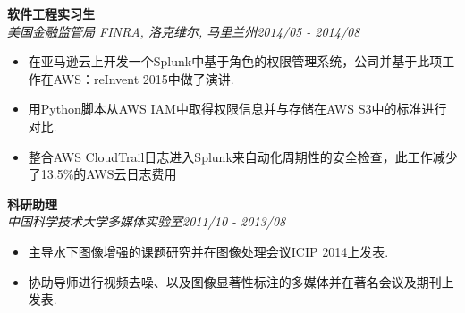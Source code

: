 \documentclass[3pt]{article}
\newenvironment{changemargin}[2]{%
  \begin{list}{}{%
    \setlength{\topsep}{0pt}%
    \setlength{\leftmargin}{#1}%
    \setlength{\rightmargin}{#2}%
    \setlength{\listparindent}{\parindent}%
    \setlength{\itemindent}{\parindent}%
    \setlength{\parsep}{\parskip}%
  }%
  \item[]}{\end{list}
}
\newenvironment{body} {
	\vspace*{-16pt}
	\begin{changemargin}{-0.25in}{-0.5in}
  }	
	{\end{changemargin}
}
\begin{document}
\begin{CJK}{UTF8}{gbsn}
\begin{body}
   \vspace{5pt}

    \textbf{软件工程实习生} \\

    \emph{美国金融监管局 FINRA, 洛克维尔, 马里兰州}\hfill \emph{2014/05 - 2014/08}\\
     \begin{itemize} \itemsep -0.5pt
    \item{在亚马逊云上开发一个Splunk中基于角色的权限管理系统，公司并基于此项工作在AWS：reInvent 2015中做了演讲.}
     \item {用Python脚本从AWS IAM中取得权限信息并与存储在AWS S3中的标准进行对比.}
     \item {整合AWS CloudTrail日志进入Splunk来自动化周期性的安全检查，此工作减少了13.5\%的AWS云日志费用}
   
    \end{itemize}
	

   \vspace{5pt}

    \textbf{科研助理} \\
    \emph{中国科学技术大学多媒体实验室}\hfill \emph{2011/10 - 2013/08}\\
     \begin{itemize} \itemsep -0.5pt
     \item {主导水下图像增强的课题研究并在图像处理会议ICIP 2014上发表.}
	\item {协助导师进行视频去噪、以及图像显著性标注的多媒体并在著名会议及期刊上发表.}
       \end{itemize}


\end{body}
\end{CJK}
\end{document}
